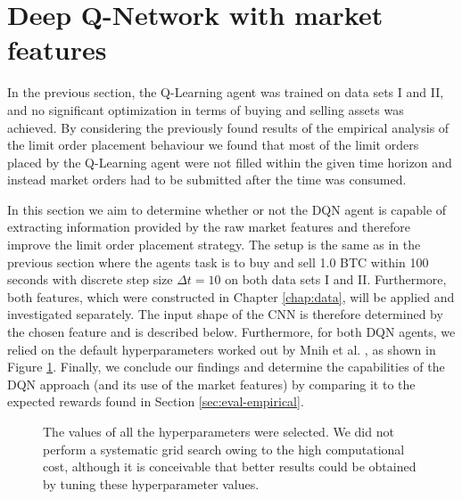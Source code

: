 \section{Deep Q-Network with market features}
\label{sec:eval-dqn}
In the previous section, the Q-Learning agent was trained on data sets I and II, and no significant optimization in terms of buying and selling assets was achieved.
By considering the previously found results of the empirical analysis of the limit order placement behaviour we found that most of the limit orders placed by the Q-Learning agent were not filled within the given time horizon and instead market orders had to be submitted after the time was consumed.

In this section we aim to determine whether or not the DQN agent is capable of extracting information provided by the raw market features and therefore improve the limit order placement strategy.
The setup is the same as in the previous section where the agents task is to buy and sell 1.0 BTC within 100 seconds with discrete step size $\Delta{t}=10$ on both data sets I and II.
Furthermore, both features, which were constructed in Chapter \ref{chap:data}, will be applied and investigated separately.
The input shape of the CNN is therefore determined by the chosen feature and is described below.
Furthermore, for both DQN agents, we relied on the default hyperparameters worked out by Mnih et al. \cite{mnih2015human}, as shown in Figure \ref{fig:eval-dqn-hyperparameters}.
Finally, we conclude our findings and determine the capabilities of the DQN approach (and its use of the market features) by comparing it to the expected rewards found in Section \ref{sec:eval-empirical}.
\begin{figure}[H]
    \centering
    \caption{The values of all the hyperparameters were selected. We did not perform a systematic grid search owing to the high computational cost, although it is conceivable that better results could be obtained by tuning these hyperparameter values.}
    \label{fig:eval-dqn-hyperparameters}
\end{figure}

